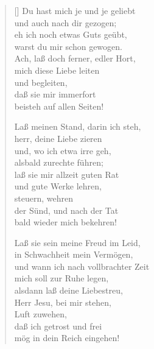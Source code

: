 \begin{multicols}{2}
\begin{verse}[\versewidth]
 Du hast mich je und je geliebt\\
und auch nach dir gezogen;\\
eh ich noch etwas Guts geübt,\\
warst du mir schon gewogen.\\
Ach, laß doch ferner, edler Hort,\\
mich diese Liebe leiten\\
und begleiten,\\
daß sie mir immerfort\\
beisteh auf allen Seiten!

 Laß meinen Stand, darin ich steh,\\
herr, deine Liebe zieren\\
und, wo ich etwa irre geh,\\
alsbald zurechte führen;\\
laß sie mir allzeit guten Rat\\
und gute Werke lehren,\\
steuern, wehren\\
der Sünd, und nach der Tat\\
bald wieder mich bekehren!

 Laß sie sein meine Freud im Leid,\\
in Schwachheit mein Vermögen,\\
und wann ich nach vollbrachter Zeit\\
mich soll zur Ruhe legen,\\
alsdann laß deine Liebestreu,\\
Herr Jesu, bei mir stehen,\\
Luft zuwehen,\\
daß ich getrost und frei\\
mög in dein Reich eingehen!

\end{verse}
\end{multicols}
